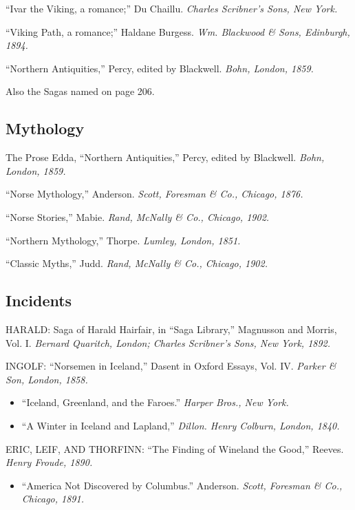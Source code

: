 \noindent ``Ivar the Viking, a romance;'' Du Chaillu. \emph{Charles
Scribner's Sons, New York.}

\noindent ``Viking Path, a romance;'' Haldane Burgess. \emph{Wm.
Blackwood \& Sons, Edinburgh, 1894.}

\noindent ``Northern Antiquities,'' Percy, edited by Blackwell.
\emph{Bohn, London, 1859.}

\noindent Also the Sagas named on page 206.

\subsection*{Mythology}

The Prose Edda, ``Northern Antiquities,'' Percy, edited by Blackwell.
\emph{Bohn, London, 1859.}

\noindent ``Norse Mythology,'' Anderson. \emph{Scott, Foresman \& Co.,
Chicago, 1876.}

\noindent ``Norse Stories,'' Mabie. \emph{Rand, McNally \& Co., Chicago,
1902.}

\noindent ``Northern Mythology,'' Thorpe. \emph{Lumley, London, 1851.}

\noindent ``Classic Myths,'' Judd. \emph{Rand, McNally \& Co., Chicago,
1902.}

\subsection*{Incidents}

HARALD: Saga of Harald Hairfair, in ``Saga Library,'' Magnusson and
Morris, Vol. I. \emph{Bernard Quaritch, London; Charles Scribner's Sons,
New York, 1892.}

\noindent INGOLF: ``Norsemen in Iceland,'' Dasent in Oxford Essays, Vol.
IV. \emph{Parker \& Son, London, 1858.}

\begin{itemize}
\item ``Iceland, Greenland, and the Faroes.'' \emph{Harper Bros., New York.}
\item ``A Winter in Iceland and Lapland,'' \emph{Dillon. Henry Colburn, London,
1840.}
\end{itemize}

\noindent ERIC, LEIF, AND THORFINN: ``The Finding of Wineland the Good,''
Reeves. \emph{Henry Froude, 1890.}

\begin{itemize}
\item ``America Not Discovered by Columbus.'' Anderson. \emph{Scott, Foresman \&
Co., Chicago, 1891.}
\end{itemize}

